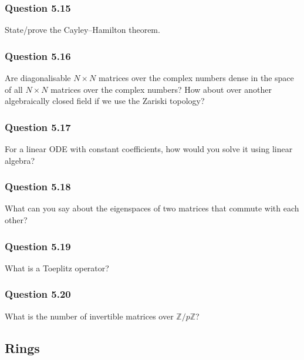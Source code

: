 \hypertarget{question-5.15}{%
\subsubsection{Question 5.15}\label{question-5.15}}

State/prove the Cayley--Hamilton theorem.

\hypertarget{question-5.16}{%
\subsubsection{Question 5.16}\label{question-5.16}}

Are diagonalisable \(N \times N\) matrices over the complex numbers
dense in the space of all \(N \times N\) matrices over the complex
numbers? How about over another algebraically closed field if we use the
Zariski topology?

\hypertarget{question-5.17}{%
\subsubsection{Question 5.17}\label{question-5.17}}

For a linear ODE with constant coefficients, how would you solve it
using linear algebra?

\hypertarget{question-5.18}{%
\subsubsection{Question 5.18}\label{question-5.18}}

What can you say about the eigenspaces of two matrices that commute with
each other?

\hypertarget{question-5.19}{%
\subsubsection{Question 5.19}\label{question-5.19}}

What is a Toeplitz operator?

\hypertarget{question-5.20}{%
\subsubsection{Question 5.20}\label{question-5.20}}

What is the number of invertible matrices over
\({\mathbb{Z}}/p{\mathbb{Z}}\)?

\hypertarget{rings}{%
\subsection{Rings}\label{rings}}

